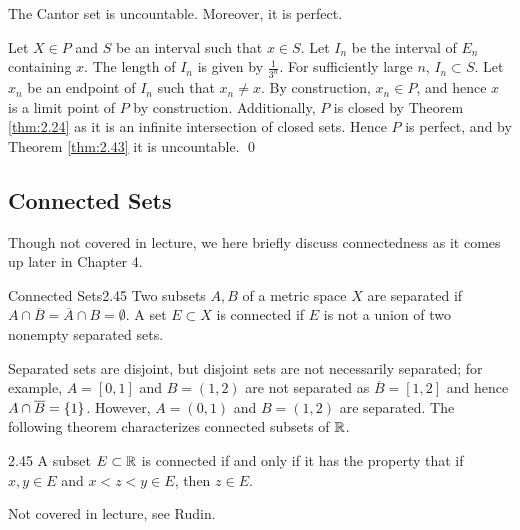 \begin{ntheorem}{}{}
    The Cantor set is uncountable. Moreover, it is perfect.
\end{ntheorem}


\begin{nproof}
    Let $X \in P$ and $S$ be an interval such that $x \in S$. Let $I_n$ be the interval of $E_n$ containing $x$. The length of $I_n$ is given by $\frac{1}{3^n}$. For sufficiently large $n$, $I_n \subset S$. Let $x_n$ be an endpoint of $I_n$ such that $x_n \neq x$. By construction, $x_n \in P$, and hence $x$ is a limit point of $P$ by construction. Additionally, $P$ is closed by Theorem \ref{thm:2.24} as it is an infinite intersection of closed sets. Hence $P$ is perfect, and by Theorem \ref{thm:2.43} it is uncountable. \qed
\end{nproof}

\subsection{Connected Sets}
Though not covered in lecture, we here briefly discuss connectedness as it comes up later in Chapter 4.

\begin{definition}{Connected Sets}{2.45}
    Two subsets $A, B$ of a metric space $X$ are separated if $A \cap \overline{B} = \overline{A} \cap B = \emptyset$. A set $E \subset X$ is connected if $E$ is not a union of two nonempty separated sets.
\end{definition}
\noindent Separated sets are disjoint, but disjoint sets are not necessarily separated; for example, $A = [0, 1]$ and $B = (1, 2)$ are not separated as $\overline{B} = [1, 2]$ and hence $A \cap \overline{B} = \set{1}$. However, $A = (0, 1)$ and $B = (1, 2)$ are separated. The following theorem characterizes connected subsets of $\mathbb{R}$. 
\begin{theorem}{}{2.45}
    A subset $E \subset \mathbb{R}$ is connected if and only if it has the property that if $x, y \in E$ and $x < z < y \in E$, then $z \in E$.
\end{theorem}
\begin{nproof}
    Not covered in lecture, see Rudin.
\end{nproof}
